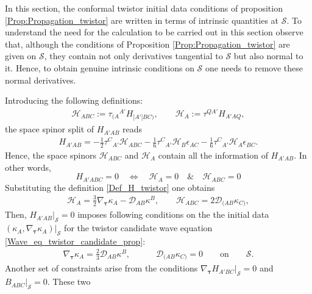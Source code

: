\documentclass[10pt,a4paper]{article}
\theoremstyle{plain}
\begin{document}
In this section, the conformal twistor initial data conditions of
proposition \ref{Prop:Propagation_twistor} are written in terms of
intrinsic quantities at $\mathcal{S}$.  To understand the need for the
calculation to be carried out in this section observe that, although
the conditions of Proposition \ref{Prop:Propagation_twistor} are given
on $\mathcal{S}$, they contain not only derivatives tangential to
$\mathcal{S}$ but also normal to it. Hence, to obtain genuine
intrinsic conditions on $\mathcal{S}$ one needs to remove these normal
derivatives.

\medskip

Introducing the following definitions:
\begin{align}
  \mathcal{H} _{ABC}  := \tau _{(A}{}^{A'}H_{|A'|BC)}, \qquad
  \mathcal{H}_{A}  :=  \tau^{QA'} H_{A'AQ},
\end{align}
the space spinor split of $H_{A'AB}$ reads
\begin{align}
  H_{A'AB} = - \tfrac{1}{2} \tau ^{C}{}_{A'} \mathcal{H} _{ABC}  -
  \tfrac{1}{6} \tau ^{C}{}_{A'} \mathcal{H} _{B} \epsilon _{AC}  -
  \tfrac{1}{6} \tau ^{C}{}_{A'} \mathcal{H} _{A} \epsilon _{BC}.
\end{align}
Hence, the space spinors $\mathcal{H} _{ABC}$ and $\mathcal{H}_{A}$
contain all the information of $H_{A'AB}$. In other words,
\[
H_{A'ABC}=0 \quad                 
\iff \quad \mathcal{H} _{A}=0    
\quad
\& \quad \mathcal{H}_{ABC}=0  
\]
Substituting the definition \eqref{Def_H_twistor} one obtains
\begin{align}\label{spacespinordecompHtotwistorders}
\mathcal{H} _{A} = \tfrac{3}{2} \nabla_{\bm\tau} \kappa_{A} - \mathcal{D} _{AB}\kappa^{B}, \qquad \mathcal{H} _{ABC} = 2 \mathcal{D} _{(AB}\kappa _{C)},
\end{align}
Then, $H_{A'AB}|_{\mathcal{S}}=0$  imposes
following conditions on the
the initial data
$(\kappa_A,\nabla_{\bm\tau}\kappa_A)|_{\mathcal{S}}$
for the twistor candidate wave equation
\eqref{Wave_eq_twistor_candidate_prop}:
\begin{align}\label{H_twistor_vanishes_ID}
 \nabla_{\bm\tau} \kappa _{A} = \tfrac{2}{3} \mathcal{D} _{AB}\kappa ^{B}, \qquad
 \quad \mathcal{D} _{(AB}\kappa _{C)}=0 \qquad \text{on} \qquad \mathcal{S}.
\end{align}
Another set of constraints arise from the conditions $\nabla_{\bm\tau}
H_{A'BC}|_{\mathcal{S}}=0$ and $B_{ABC}|_{\mathcal{S}}=0$. These two
\end{document}
